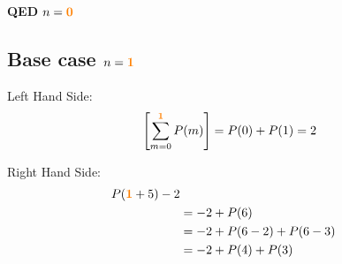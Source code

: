\documentclass[11pt]{article}
\def \subsorange [#1]{\mathbf{\textcolor{orange}{#1}}}
\begin{document}
\textbf{QED} $n=\subsorange[0]$

\pagebreak
\subsection*{Base case $n=\subsorange[1]$}

Left Hand Side:
\[
   \left[\sum_{m=0}^{\subsorange[1]}P(m)\right]=P(0)+P(1)=2
\]

Right Hand Side:
\begin{alignat*}{2}
   P(\subsorange[1]+5)-2 \\
   &=-2+P(6) \\
   &=-2+P(6-2) + P(6-3) \\
   &=-2+P(4) + P(3) \\
\end{alignat*}
\end{document}
